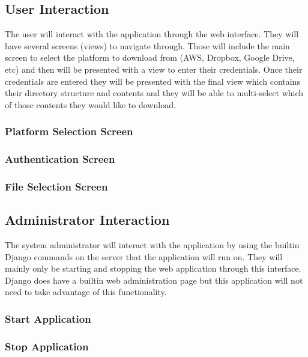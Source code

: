 \documentclass{article}
\begin{document}
    \subsection{User Interaction}
    The user will interact with the application through the web interface. They will have several screens (views)
    to navigate through. Those will include the main screen to select the platform to download from (AWS, Dropbox,
    Google Drive, etc) and then will be presented with a view to enter their credentials. Once their credentials
    are entered they will be presented with the final view which contains their directory structure and contents
    and they will be able to multi-select which of those contents they would like to download.
    
      \subsubsection{Platform Selection Screen}
    
      \subsubsection{Authentication Screen}
    
      \subsubsection{File Selection Screen}
    
    \subsection{Administrator Interaction}
    The system administrator will interact with the application by using the builtin Django commands on the
    server that the application will run on. They will mainly only be starting and stopping the web application
    through this interface. Django does have a builtin web administration page but this application will not
    need to take advantage of this functionality.

      \subsubsection{Start Application}

      \subsubsection{Stop Application}
\end{document}
